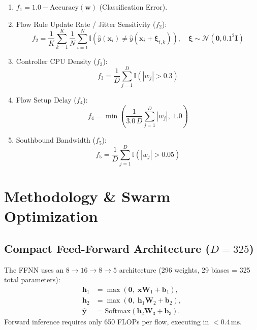 \documentclass[journal]{IEEEtran}
\begin{document}
\begin{enumerate}
  \item $f_1 = 1.0 - \mathrm{Accuracy}(\mathbf{w})$ (Classification Error).
  \item Flow Rule Update Rate / Jitter Sensitivity ($f_2$):
    \begin{equation}
      f_2 = \frac{1}{K}\sum_{k=1}^K \frac{1}{N}\sum_{i=1}^N
      \mathbb{I}\!\left(\hat{y}(\mathbf{x}_i) \neq
      \hat{y}(\mathbf{x}_i + \boldsymbol{\xi}_{i,k})\right), \quad
      \boldsymbol{\xi}\sim\mathcal{N}(\mathbf{0},0.1^2\mathbf{I})
      \label{eq:f2}
    \end{equation}
  \item Controller CPU Density ($f_3$):
    \begin{equation}
      f_3 = \frac{1}{D}\sum_{j=1}^D \mathbb{I}(|w_j|>0.3)
      \label{eq:f3}
    \end{equation}
  \item Flow Setup Delay ($f_4$):
    \begin{equation}
      f_4 = \min\!\left(\frac{1}{3.0\,D}\sum_{j=1}^D |w_j|,\;1.0\right)
      \label{eq:f4}
    \end{equation}
  \item Southbound Bandwidth ($f_5$):
    \begin{equation}
      f_5 = \frac{1}{D}\sum_{j=1}^D \mathbb{I}(|w_j|>0.05)
      \label{eq:f5}
    \end{equation}
\end{enumerate}

\section{Methodology \& Swarm Optimization}
\label{sec:method}

\subsection{Compact Feed-Forward Architecture ($D{=}325$)}
The FFNN uses an $8{\to}16{\to}8{\to}5$ architecture (296 weights, 29 biases
= 325 total parameters):
\begin{align}
  \mathbf{h}_1 &= \max(\mathbf{0},\; \mathbf{x}\mathbf{W}_1 + \mathbf{b}_1),
  \nonumber\\
  \mathbf{h}_2 &= \max(\mathbf{0},\; \mathbf{h}_1\mathbf{W}_2 + \mathbf{b}_2),
  \nonumber\\
  \hat{\mathbf{y}} &= \mathrm{Softmax}(\mathbf{h}_2\mathbf{W}_3 + \mathbf{b}_3).
  \label{eq:ffnn}
\end{align}
Forward inference requires only 650 FLOPs per flow, executing in $<0.4\,\text{ms}$.
\end{document}
